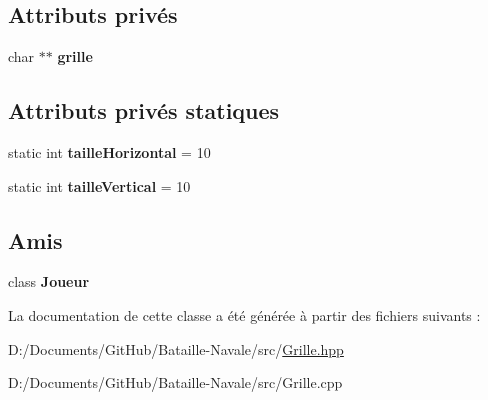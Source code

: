 \subsection*{Attributs privés}
\begin{DoxyCompactItemize}
\item 
\mbox{\label{class_grille_abd4bc59ff38259962e5d8d3c18d1ae6b}} 
char $\ast$$\ast$ {\bfseries grille}
\end{DoxyCompactItemize}
\subsection*{Attributs privés statiques}
\begin{DoxyCompactItemize}
\item 
\mbox{\label{class_grille_aa7cfe2eeb6fc29990dd4be1b329d6b59}} 
static int {\bfseries taille\+Horizontal} = 10
\item 
\mbox{\label{class_grille_ae621c3c7d27681684eea959403beb4f9}} 
static int {\bfseries taille\+Vertical} = 10
\end{DoxyCompactItemize}
\subsection*{Amis}
\begin{DoxyCompactItemize}
\item 
\mbox{\label{class_grille_aa7383e9c02af27ebd2d9d65053e899ce}} 
class {\bfseries Joueur}
\end{DoxyCompactItemize}


La documentation de cette classe a été générée à partir des fichiers suivants \+:\begin{DoxyCompactItemize}
\item 
D\+:/\+Documents/\+Git\+Hub/\+Bataille-\/\+Navale/src/\mbox{\hyperlink{_grille_8hpp}{Grille.\+hpp}}\item 
D\+:/\+Documents/\+Git\+Hub/\+Bataille-\/\+Navale/src/Grille.\+cpp\end{DoxyCompactItemize}
